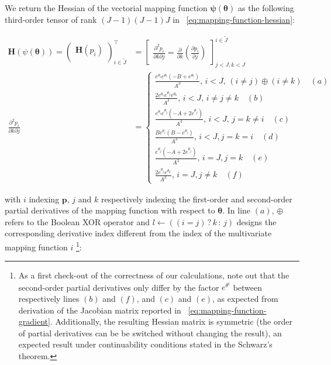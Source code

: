 \documentclass[long, final]{jobim}
\begin{document}
We return the Hessian of the vectorial mapping function $\boldsymbol{\psi (\theta)}$ as the following third-order tensor of rank $(J-1)(J-1)J$ in \equationname~\ref{eq:mapping-function-hessian}:


\begin{equation}
    \label{eq:mapping-function-hessian}
    \begin{aligned}
    \mathbf{H} (\psi(\boldsymbol{\theta})) = 
\begin{pmatrix}
 \mathbf{H} (p_i)\\
\end{pmatrix}_{i \in \widetilde{J} }^\top &=
\begin{bmatrix}
\frac{\partial^2 p_i}{\partial k \partial j} = \frac{\partial}{\partial k} \left( \frac{\partial p_i}{\partial j}\right)
\end{bmatrix}_{j < J, k < J}^{i \in \widetilde{J}}\\        
   \frac{\partial^2 p_i}{\partial k \partial j} &=
\begin{cases}
\frac{e^{\theta_i} e^{\theta_l} \left (-B + e^{\theta_l}\right)}{A^3},\, i<J, \, (i\neq j) \oplus(i\neq k) \quad (a)\\
\frac{2 e^{\theta_i} e^{\theta_j} e^{\theta_k} }{A^3}, \, i<J, \, i \neq j \neq k  \quad (b)\\
\frac{e^{\theta_i} e^{\theta_j} \left (-A + 2e^{\theta_j}\right)}{A^3}, \, i<J, \, j=k\neq i  \quad (c)\\
\frac{B e^{\theta_i} \left( B -  e^{\theta_i}\right)}{A^3}, \, i<J, j = k = i  \quad (d)\\
\frac{e^{\theta_j} \left( -A + 2 e^{\theta_j}\right)}{A^3}, \, i=J, j = k  \quad (e)\\
\frac{2 e^{\theta_j} e^{\theta_k}}{A^3}, \, i=J, j \neq k  \quad (f)
\end{cases}
  \end{aligned}
\end{equation}

with $i$ indexing $\boldsymbol{p}$, $j$ and $k$ respectively indexing the first-order and second-order partial derivatives of the mapping function with respect to $\boldsymbol{\theta}$. In line $(a)$, $\oplus$ refers to the Boolean XOR operator and $l \leftarrow \left((i=j)\, ?\, k\,: \,j\right)$ designs the corresponding derivative index different from the index of the multivariate mapping function $i$ \footnote{As a first check-out of the correctness of our calculations, note out that the second-order partial derivatives only differ by the factor $e^{\theta^i}$ between respectively lines $(b)$ and $(f)$, and $(c)$ and $(e)$, as expected from derivation of the Jacobian matrix reported in \equationname~\ref{eq:mapping-function-gradient}. Additionally, the resulting Hessian matrix is symmetric (the order of partial derivatives can be be switched without changing the result), an expected result under continuability conditions stated in the Schwarz's theorem.}: 
\end{document}
